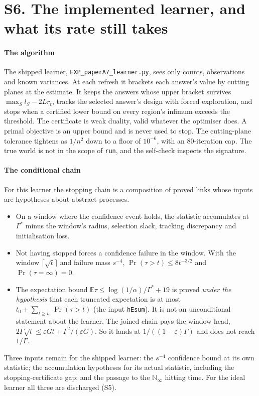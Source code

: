 
\section{S6. The implemented learner, and what its rate still takes}

\paragraph{The algorithm} The shipped learner, \texttt{EXP\_paperA7\_learner.py}, sees only
counts, observations and known variances. At each refresh it brackets each answer's value by
cutting planes at the estimate. It keeps the answers whose upper bracket survives
$\max_{S}l_{S}-2Lr_{t}$, tracks the selected answer's design with forced exploration, and stops
when a certified lower bound on every region's infimum exceeds the threshold. The certificate is
weak duality, valid whatever the optimiser does. A primal objective is an upper bound and is
never used to stop. The cutting-plane tolerance tightens as $1/n^{2}$ down to a floor of
$10^{-6}$, with an 80-iteration cap. The true world is not in the scope of \texttt{run}, and the
self-check inspects the signature.

\paragraph{The conditional chain} For this learner the stopping chain is a composition of proved
links whose inputs are hypotheses about abstract processes.
\begin{itemize}
\item On a window where the confidence event holds, the statistic accumulates at
$\Gamma^{*}$ minus the window's radius, selection slack, tracking discrepancy and
initialisation loss.
\item Not having stopped forces a confidence failure in the window. With the window
$\lceil\sqrt t\rceil$ and failure mass $s^{-4}$, $\Pr(\tau>t)\le8t^{-3/2}$ and
$\Pr(\tau=\infty)=0$.
\item The expectation bound $\mathbb{E}\tau\le\log(1/\alpha)/\Gamma^{*}+19$ is proved
\emph{under the hypothesis} that each truncated expectation is at most
$t_{0}+\sum_{t\ge t_{0}}\Pr(\tau>t)$ (the input \texttt{hEsum}). It is not an unconditional
statement about the learner. The joined chain pays the window head,
$2\Gamma\sqrt t\le\varepsilon Gt+\Gamma^{2}/(\varepsilon G)$. So it lands at
$1/((1-\varepsilon)\Gamma)$ and does not reach $1/\Gamma$.
\end{itemize}
Three inputs remain for the shipped learner: the $s^{-4}$ confidence bound at its own
statistic; the accumulation hypotheses for its actual statistic, including the
stopping-certificate gap; and the passage to the $\mathbb{N}_{\infty}$ hitting time. For the
ideal learner all three are discharged (S5).

